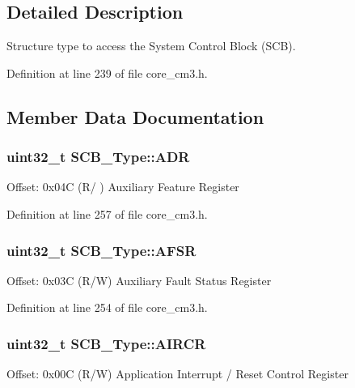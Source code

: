 \subsection{\-Detailed \-Description}
\-Structure type to access the \-System \-Control \-Block (\-S\-C\-B). 

\-Definition at line 239 of file core\-\_\-cm3.\-h.



\subsection{\-Member \-Data \-Documentation}
\hypertarget{struct_s_c_b___type_aaedf846e435ed05c68784b40d3db2bf2}{
\subsubsection[{\-A\-D\-R}]{ uint32\-\_\-t {\bf \-S\-C\-B\-\_\-\-Type\-::\-A\-D\-R}}}\label{struct_s_c_b___type_aaedf846e435ed05c68784b40d3db2bf2}
\-Offset\-: 0x04\-C (\-R/ ) \-Auxiliary \-Feature \-Register 

\-Definition at line 257 of file core\-\_\-cm3.\-h.

\hypertarget{struct_s_c_b___type_aeb77053c84f49c261ab5b8374e8958ef}{
\subsubsection[{\-A\-F\-S\-R}]{ uint32\-\_\-t {\bf \-S\-C\-B\-\_\-\-Type\-::\-A\-F\-S\-R}}}\label{struct_s_c_b___type_aeb77053c84f49c261ab5b8374e8958ef}
\-Offset\-: 0x03\-C (\-R/\-W) \-Auxiliary \-Fault \-Status \-Register 

\-Definition at line 254 of file core\-\_\-cm3.\-h.

\hypertarget{struct_s_c_b___type_a6ed3c9064013343ea9fd0a73a734f29d}{
\subsubsection[{\-A\-I\-R\-C\-R}]{ uint32\-\_\-t {\bf \-S\-C\-B\-\_\-\-Type\-::\-A\-I\-R\-C\-R}}}\label{struct_s_c_b___type_a6ed3c9064013343ea9fd0a73a734f29d}
\-Offset\-: 0x00\-C (\-R/\-W) \-Application \-Interrupt / \-Reset \-Control \-Register 

